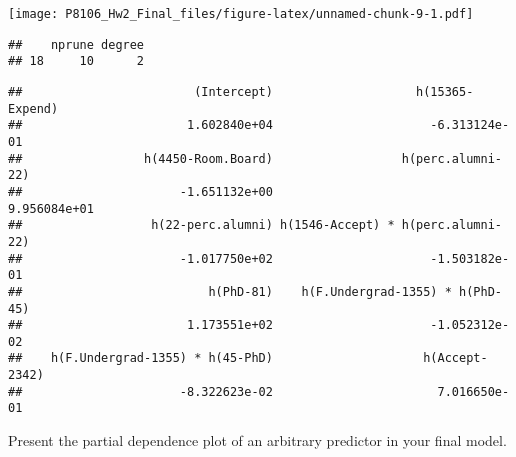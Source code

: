 \documentclass[]{article}
\newenvironment{Shaded}{\begin{snugshade}}{\end{snugshade}}
\newcommand{\DataTypeTok}[1]{\textcolor[rgb]{0.13,0.29,0.53}{#1}}
\newcommand{\DecValTok}[1]{\textcolor[rgb]{0.00,0.00,0.81}{#1}}
\newcommand{\KeywordTok}[1]{\textcolor[rgb]{0.13,0.29,0.53}{\textbf{#1}}}
\newcommand{\NormalTok}[1]{#1}
\newcommand{\OperatorTok}[1]{\textcolor[rgb]{0.81,0.36,0.00}{\textbf{#1}}}
\newcommand{\OtherTok}[1]{\textcolor[rgb]{0.56,0.35,0.01}{#1}}
\newcommand{\StringTok}[1]{\textcolor[rgb]{0.31,0.60,0.02}{#1}}
\begin{document}
\texttt{[image: P8106\_Hw2\_Final\_files/figure-latex/unnamed-chunk-9-1.pdf]}

\begin{Shaded}
\end{Shaded}

\begin{verbatim}
##    nprune degree
## 18     10      2
\end{verbatim}

\begin{Shaded}
\end{Shaded}

\begin{verbatim}
##                        (Intercept)                    h(15365-Expend) 
##                       1.602840e+04                      -6.313124e-01 
##                 h(4450-Room.Board)                  h(perc.alumni-22) 
##                      -1.651132e+00                       9.956084e+01 
##                  h(22-perc.alumni) h(1546-Accept) * h(perc.alumni-22) 
##                      -1.017750e+02                      -1.503182e-01 
##                          h(PhD-81)    h(F.Undergrad-1355) * h(PhD-45) 
##                       1.173551e+02                      -1.052312e-02 
##    h(F.Undergrad-1355) * h(45-PhD)                     h(Accept-2342) 
##                      -8.322623e-02                       7.016650e-01
\end{verbatim}

Present the partial dependence plot of an arbitrary predictor in your
final model.

\begin{Shaded}
\end{Shaded}
\end{document}

